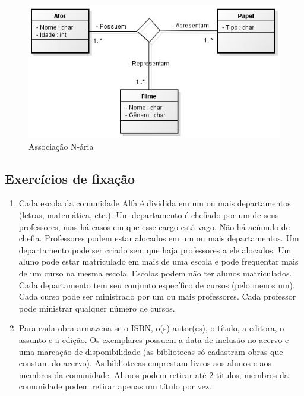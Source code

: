 \begin{figure}[H]
	\centering
	\includegraphics[scale=0.8]{imagens/associacao-ternaria.jpg}
	\caption{Associação N-ária}
	\label{fig:ass-enaria}
\end{figure}

\subsection{Exercícios de fixação}

\begin{enumerate}
	\item Cada escola da comunidade Alfa é dividida em um ou mais departamentos (letras, matemática, etc.). Um departamento é chefiado por um de seus professores, mas há casos em que esse cargo está vago. Não há acúmulo de chefia. Professores podem estar alocados em um ou mais departamentos. Um departamento pode ser criado sem que haja professores a ele alocados. Um aluno pode estar matriculado em mais de uma escola e pode frequentar mais de um curso na mesma escola. Escolas podem não ter alunos matriculados. Cada departamento tem seu conjunto específico de cursos (pelo menos um). Cada curso pode ser ministrado por um ou mais professores. Cada professor pode ministrar qualquer número de cursos.
	\item Para cada obra armazena-se o ISBN, o(s) autor(es), o título, a editora, o assunto e a edição. Os exemplares possuem a data de inclusão no acervo e uma marcação de disponibilidade (as bibliotecas só cadastram obras que constam do acervo).
	As bibliotecas emprestam livros aos alunos e aos membros da comunidade. Alunos podem retirar até 2 títulos; membros da comunidade podem retirar apenas um título por vez.
\end{enumerate}